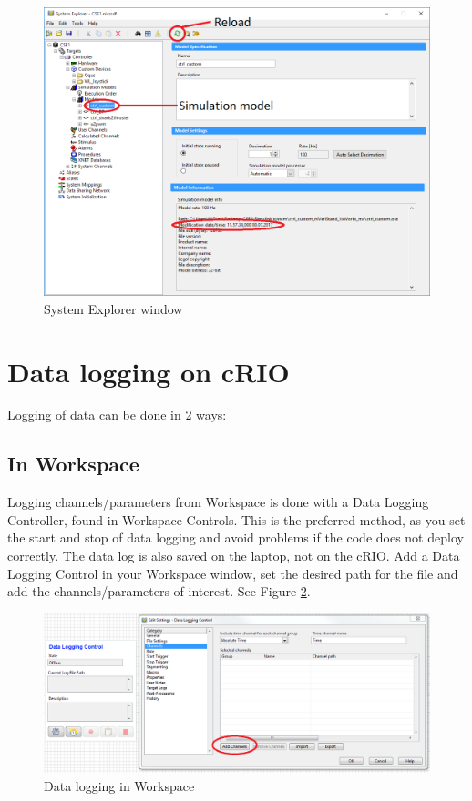 \documentclass[a4paper,english]{report}
\begin{document}
	\begin{figure}[htb!]
		\centering
		\includegraphics[scale=0.5]{fig/system_explorer.png}
		\caption{System Explorer window}
		\label{fig:system_explorer}
	\end{figure}
\section{Data logging on cRIO}
Logging of data can be done in 2 ways:
\subsection{In Workspace}
Logging channels/parameters from Workspace is done with a Data Logging Controller, found in Workspace Controls. This is the preferred method, as you set the start and stop of data logging and avoid problems if the code does not deploy correctly. The data log is also saved on the laptop, not on the cRIO. Add a Data Logging Control in your Workspace window, set the desired path for the file and add the channels/parameters of interest. See Figure \ref{fig:data_logging}. 
\begin{figure}[htb!]
	\centerline{\includegraphics[scale=0.5]{fig/data_logging.png}}
	\caption{Data logging in Workspace}
	\label{fig:data_logging}
\end{figure}
\end{document}
